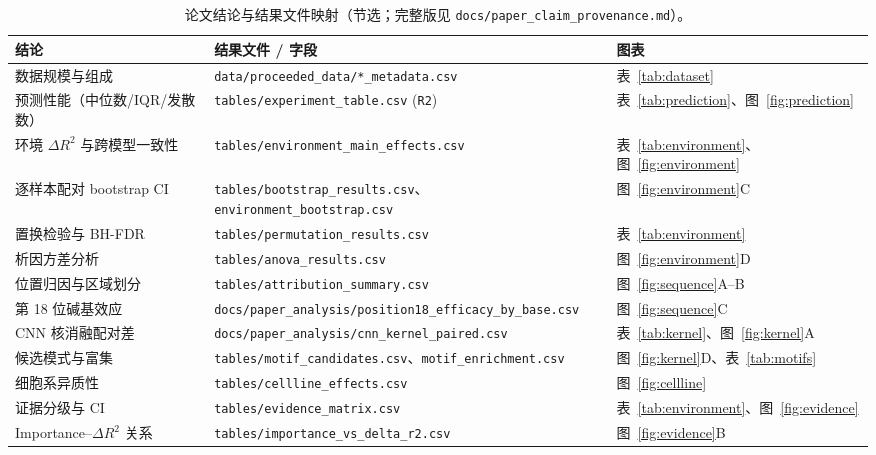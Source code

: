 \begin{table}[htbp]
\centering
\small
\caption{论文结论与结果文件映射（节选；完整版见 \texttt{docs/paper\_claim\_provenance.md}）。}
\label{tab:claimmap}
\begin{tabular}{p{5.4cm}p{6.6cm}p{2.6cm}}
\toprule
结论 & 结果文件 / 字段 & 图表 \\
\midrule
数据规模与组成 & \texttt{data/proceeded\_data/*\_metadata.csv} & 表~\ref{tab:dataset} \\
预测性能（中位数/IQR/发散数） & \texttt{tables/experiment\_table.csv} (\texttt{R2}) & 表~\ref{tab:prediction}、图~\ref{fig:prediction} \\
环境 $\Delta R^{2}$ 与跨模型一致性 & \texttt{tables/environment\_main\_effects.csv} & 表~\ref{tab:environment}、图~\ref{fig:environment} \\
逐样本配对 bootstrap CI & \texttt{tables/bootstrap\_results.csv}、\texttt{environment\_bootstrap.csv} & 图~\ref{fig:environment}C \\
置换检验与 BH-FDR & \texttt{tables/permutation\_results.csv} & 表~\ref{tab:environment} \\
析因方差分析 & \texttt{tables/anova\_results.csv} & 图~\ref{fig:environment}D \\
位置归因与区域划分 & \texttt{tables/attribution\_summary.csv} & 图~\ref{fig:sequence}A--B \\
第 18 位碱基效应 & \texttt{docs/paper\_analysis/position18\_efficacy\_by\_base.csv} & 图~\ref{fig:sequence}C \\
CNN 核消融配对差 & \texttt{docs/paper\_analysis/cnn\_kernel\_paired.csv} & 表~\ref{tab:kernel}、图~\ref{fig:kernel}A \\
候选模式与富集 & \texttt{tables/motif\_candidates.csv}、\texttt{motif\_enrichment.csv} & 图~\ref{fig:kernel}D、表~\ref{tab:motifs} \\
细胞系异质性 & \texttt{tables/cellline\_effects.csv} & 图~\ref{fig:cellline} \\
证据分级与 CI & \texttt{tables/evidence\_matrix.csv} & 表~\ref{tab:environment}、图~\ref{fig:evidence} \\
Importance--$\Delta R^{2}$ 关系 & \texttt{tables/importance\_vs\_delta\_r2.csv} & 图~\ref{fig:evidence}B \\
\bottomrule
\end{tabular}
\end{table}
